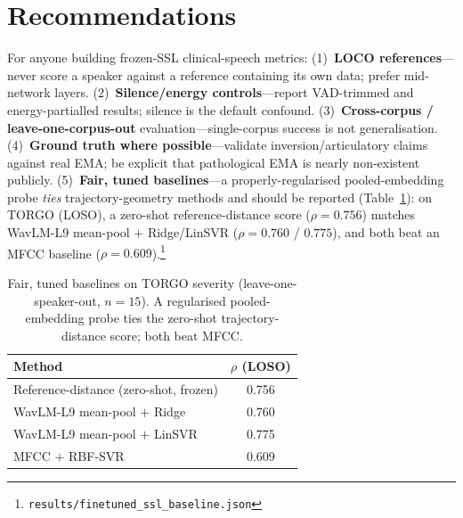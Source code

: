 \documentclass[10pt,twocolumn]{article}
\begin{document}
\section{Recommendations}
For anyone building frozen-SSL clinical-speech metrics:
(1)~\textbf{LOCO references}---never score a speaker against a reference
containing its own data; prefer mid-network layers.
(2)~\textbf{Silence/energy controls}---report VAD-trimmed and energy-partialled
results; silence is the default confound.
(3)~\textbf{Cross-corpus / leave-one-corpus-out} evaluation---single-corpus
success is not generalisation.
(4)~\textbf{Ground truth where possible}---validate inversion/articulatory
claims against real EMA; be explicit that pathological EMA is nearly
non-existent publicly.
(5)~\textbf{Fair, tuned baselines}---a properly-regularised pooled-embedding
probe \emph{ties} trajectory-geometry methods and should be reported
(Table~\ref{tab:baselines}): on TORGO (LOSO), a zero-shot reference-distance
score ($\rho{=}0.756$) matches WavLM-L9 mean-pool $+$ Ridge/LinSVR
($\rho{=}0.760$ / $0.775$), and both beat an MFCC baseline
($\rho{=}0.609$).\footnote{\texttt{results/finetuned\_ssl\_baseline.json}}

\begin{table}[t]
\centering
\caption{Fair, tuned baselines on TORGO severity (leave-one-speaker-out,
$n{=}15$). A regularised pooled-embedding probe ties the zero-shot
trajectory-distance score; both beat MFCC.}
\label{tab:baselines}
\small
\begin{tabular}{@{}lc@{}}
\toprule
Method & $\rho$ (LOSO)\\
\midrule
Reference-distance (zero-shot, frozen) & 0.756\\
WavLM-L9 mean-pool $+$ Ridge           & 0.760\\
WavLM-L9 mean-pool $+$ LinSVR          & 0.775\\
MFCC $+$ RBF-SVR                       & 0.609\\
\bottomrule
\end{tabular}
\end{table}

\end{document}
